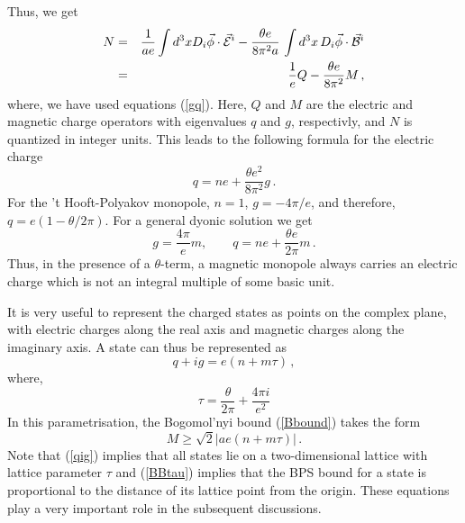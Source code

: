 Thus, we get
\begin{eqnarray}
N &=&\frac{1}{ae} \int d^{3}x D_{i}\vec{\phi} \cdot \vec{\cal E}^i
- \frac{\theta e}{8\pi^{2}a}\,\int d^3x \, D_{i}\vec{\phi}
\cdot \vec{\cal B}^i \nonumber\\
&=& \frac{1}{e} Q - \frac{\theta e}{8 \pi^2} M \,,\nonumber
\end{eqnarray}
where, we have used equations (\ref{gq}). Here, $Q$ and $M$ are the
electric and magnetic charge operators with eigenvalues $q$ and $g$,
respectivly, and $N$ is quantized in integer units. This leads to the
following formula for the electric charge 
$$
q=ne + \frac{\theta e^2}{8\pi^2} g \,.
$$  
For the 't Hooft-Polyakov monopole, $n=1$, $g=-4\pi/e$, and
therefore, $q=e(1-\theta/2\pi)$. For a general dyonic solution we get
\begin{equation}
g= \frac{4\pi}{e} m,\qquad q = ne + \frac{\theta e}{2\pi}m\,.
\label{gqtheta}
\end{equation}
Thus, in the presence of a $\theta$-term, a magnetic monopole always
carries an electric charge which is not an integral multiple of some
basic unit.  

It is very useful to represent the charged states as points on the
complex plane, with electric charges along the real axis and magnetic
charges along the imaginary axis. A state can thus be represented as
\begin{equation}
q+ig=e(n+m\tau)\,,
\label{qig}
\end{equation}
where,
\begin{equation}
\tau=\frac{\theta}{2\pi} + \frac{4\pi i}{e^2}
\label{tau}
\end{equation}
In this parametrisation, the Bogomol'nyi bound (\ref{Bbound}) takes
the form 
\begin{equation}
M \geq {\sqrt 2}|ae(n+m\tau)|\,.
\label{BBtau}
\end{equation}
Note that (\ref{qig}) implies that all states lie on a two-dimensional
lattice with lattice parameter $\tau$ and (\ref{BBtau}) implies that
the BPS bound for a state is proportional to the distance of its
lattice point from the origin. These equations play a very important
role in the subsequent discussions.    
